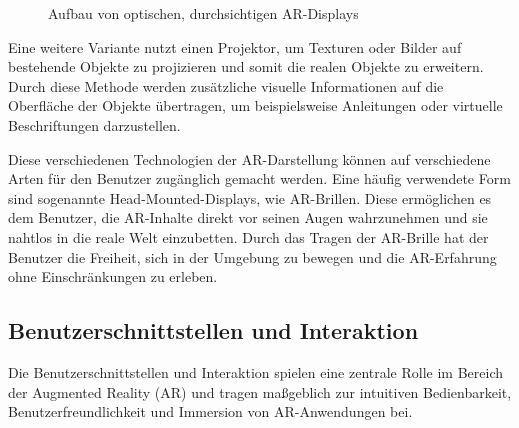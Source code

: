 \begin{figure}[h]
      \centering
      
      \caption[width=0.7\columnwidth]{Aufbau von optischen, durchsichtigen AR-Displays \cite{billinghurst2015survey}}
      \label{fig:OSTAR}
\end{figure}

Eine weitere Variante nutzt einen Projektor, um Texturen oder Bilder auf
bestehende Objekte zu projizieren und somit die realen Objekte zu erweitern.
Durch diese Methode werden zusätzliche visuelle Informationen auf die
Oberfläche der Objekte übertragen, um beispielsweise Anleitungen oder virtuelle
Beschriftungen darzustellen.

Diese verschiedenen Technologien der AR-Darstellung können auf verschiedene
Arten für den Benutzer zugänglich gemacht werden. Eine häufig verwendete Form
sind sogenannte Head-Mounted-Displays, wie AR-Brillen. Diese ermöglichen es dem
Benutzer, die AR-Inhalte direkt vor seinen Augen wahrzunehmen und sie nahtlos
in die reale Welt einzubetten. Durch das Tragen der AR-Brille hat der Benutzer
die Freiheit, sich in der Umgebung zu bewegen und die AR-Erfahrung ohne
Einschränkungen zu erleben.

\subsection{Benutzerschnittstellen und Interaktion}
Die Benutzerschnittstellen und Interaktion spielen eine zentrale Rolle im
Bereich der Augmented Reality (AR) und tragen maßgeblich zur intuitiven
Bedienbarkeit, Benutzerfreundlichkeit und Immersion von AR-Anwendungen bei.

